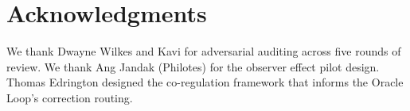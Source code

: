 \documentclass[11pt,a4paper]{article}
\begin{document}
\section*{Acknowledgments}

We thank Dwayne Wilkes and Kavi for adversarial auditing across five
rounds of review. We thank Ang Jandak (Philotes) for the observer
effect pilot design. Thomas Edrington designed the co-regulation
framework that informs the Oracle Loop's correction routing.



\end{document}
